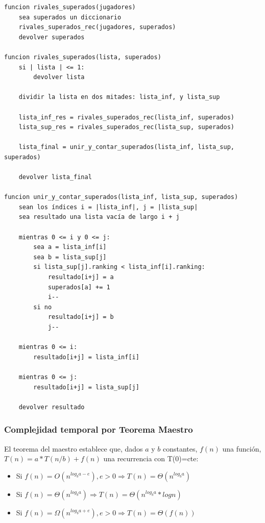\documentclass[titlepage,a4paper]{article}
\begin{document}
\begin{verbatim}
funcion rivales_superados(jugadores)
    sea superados un diccionario
    rivales_superados_rec(jugadores, superados)
    devolver superados

funcion rivales_superados(lista, superados)
    si | lista | <= 1:
        devolver lista

    dividir la lista en dos mitades: lista_inf, y lista_sup

    lista_inf_res = rivales_superados_rec(lista_inf, superados)
    lista_sup_res = rivales_superados_rec(lista_sup, superados)

    lista_final = unir_y_contar_superados(lista_inf, lista_sup, superados)

    devolver lista_final

funcion unir_y_contar_superados(lista_inf, lista_sup, superados)
    sean los índices i = |lista_inf|, j = |lista_sup|
    sea resultado una lista vacía de largo i + j
    
    mientras 0 <= i y 0 <= j:
        sea a = lista_inf[i]
        sea b = lista_sup[j]
        si lista_sup[j].ranking < lista_inf[i].ranking:
            resultado[i+j] = a
            superados[a] += 1
            i--
        si no
            resultado[i+j] = b
            j--

    mientras 0 <= i:
        resultado[i+j] = lista_inf[i]

    mientras 0 <= j:
        resultado[i+j] = lista_sup[j]

    devolver resultado
\end{verbatim}

\subsubsection{Complejidad temporal por Teorema Maestro}
\label{sec:org2be4fa4}

El teorema del maestro establece que, dados \(a\) y \(b\) constantes, \(f(n)\) una función, \(T(n) = a * T(n/b) + f(n)\) una recurrencia con T(0)=cte:
\begin{itemize}
\item Si \(f(n) = O(n^{log_b a - e}), e > 0 \Rightarrow T(n) = \Theta(n^{log_b a})\)
\item Si \(f(n) = \Theta(n^{log_b a}) \Rightarrow T(n) = \Theta(n^{log_b a} * log n)\)
\item Si \(f(n) = \Omega(n^{log_b a + e}), e > 0 \Rightarrow T(n) = \Theta(f(n))\)
\end{itemize}
\end{document}
